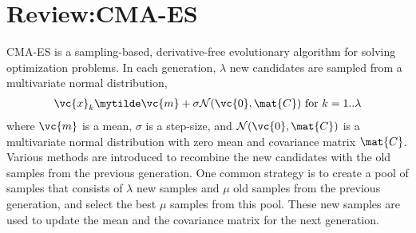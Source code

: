\section{Review:CMA-ES}
CMA-ES is a sampling-based, derivative-free evolutionary
algorithm for solving optimization problems. In each generation, $\lambda$ new
candidates are sampled from a multivariate normal distribution,
\begin{equation}
  \begin{aligned}
    \vc{x}_k \mytilde \vc{m} + \sigma \mathcal{N}(\vc{0},
    \mat{C}) \text{ for } k = 1 .. \lambda
  \end{aligned}
\end{equation} 
where $\vc{m}$ is a mean, $\sigma$ is a step-size, and
$\mathcal{N}(\vc{0}, \mat{C})$ is a multivariate normal 
distribution with zero mean and covariance matrix $\mat{C}$. Various
methods are introduced to recombine the new candidates with the old
samples from the previous generation. One common strategy is to create
a pool of samples that consists of $\lambda$ new samples and $\mu$ old
samples from the previous generation, and select the best $\mu$
samples from this pool. These new samples are used to update the mean
and the covariance matrix for the next generation.

